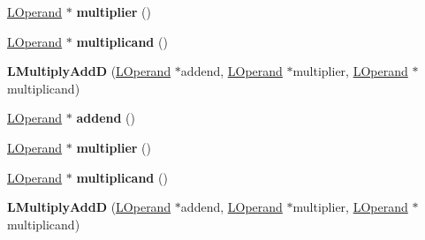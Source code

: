 \begin{DoxyCompactItemize}
\item 
\hyperlink{classv8_1_1internal_1_1_l_operand}{L\+Operand} $\ast$ {\bfseries multiplier} ()\hypertarget{classv8_1_1internal_1_1_l_multiply_add_d_a23e4d88a87ada2c97d1578583dc168e4}{}\label{classv8_1_1internal_1_1_l_multiply_add_d_a23e4d88a87ada2c97d1578583dc168e4}

\item 
\hyperlink{classv8_1_1internal_1_1_l_operand}{L\+Operand} $\ast$ {\bfseries multiplicand} ()\hypertarget{classv8_1_1internal_1_1_l_multiply_add_d_adfc437df26c40abd1186f8a268b5683e}{}\label{classv8_1_1internal_1_1_l_multiply_add_d_adfc437df26c40abd1186f8a268b5683e}

\item 
{\bfseries L\+Multiply\+AddD} (\hyperlink{classv8_1_1internal_1_1_l_operand}{L\+Operand} $\ast$addend, \hyperlink{classv8_1_1internal_1_1_l_operand}{L\+Operand} $\ast$multiplier, \hyperlink{classv8_1_1internal_1_1_l_operand}{L\+Operand} $\ast$multiplicand)\hypertarget{classv8_1_1internal_1_1_l_multiply_add_d_adda9b3e6704e69d365cd21ebdd1e8388}{}\label{classv8_1_1internal_1_1_l_multiply_add_d_adda9b3e6704e69d365cd21ebdd1e8388}

\item 
\hyperlink{classv8_1_1internal_1_1_l_operand}{L\+Operand} $\ast$ {\bfseries addend} ()\hypertarget{classv8_1_1internal_1_1_l_multiply_add_d_a035089376f4e7625f84c55437a842d20}{}\label{classv8_1_1internal_1_1_l_multiply_add_d_a035089376f4e7625f84c55437a842d20}

\item 
\hyperlink{classv8_1_1internal_1_1_l_operand}{L\+Operand} $\ast$ {\bfseries multiplier} ()\hypertarget{classv8_1_1internal_1_1_l_multiply_add_d_a23e4d88a87ada2c97d1578583dc168e4}{}\label{classv8_1_1internal_1_1_l_multiply_add_d_a23e4d88a87ada2c97d1578583dc168e4}

\item 
\hyperlink{classv8_1_1internal_1_1_l_operand}{L\+Operand} $\ast$ {\bfseries multiplicand} ()\hypertarget{classv8_1_1internal_1_1_l_multiply_add_d_adfc437df26c40abd1186f8a268b5683e}{}\label{classv8_1_1internal_1_1_l_multiply_add_d_adfc437df26c40abd1186f8a268b5683e}

\item 
{\bfseries L\+Multiply\+AddD} (\hyperlink{classv8_1_1internal_1_1_l_operand}{L\+Operand} $\ast$addend, \hyperlink{classv8_1_1internal_1_1_l_operand}{L\+Operand} $\ast$multiplier, \hyperlink{classv8_1_1internal_1_1_l_operand}{L\+Operand} $\ast$multiplicand)\hypertarget{classv8_1_1internal_1_1_l_multiply_add_d_adda9b3e6704e69d365cd21ebdd1e8388}{}\label{classv8_1_1internal_1_1_l_multiply_add_d_adda9b3e6704e69d365cd21ebdd1e8388}


\end{DoxyCompactItemize}
